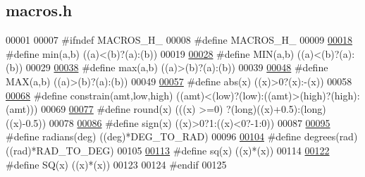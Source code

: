 \hypertarget{macros_8h_source}{}\subsection{macros.\+h}
\label{macros_8h_source}

\begin{DoxyCode}
00001 
00007 \textcolor{preprocessor}{#ifndef MACROS\_H\_}
00008 \textcolor{preprocessor}{#define MACROS\_H\_}
00009 
\hypertarget{macros_8h_source.tex_l00018}{}\hyperlink{macros_8h_ac6afabdc09a49a433ee19d8a9486056d}{00018} \textcolor{preprocessor}{#define min(a,b) ((a)<(b)?(a):(b))}
00019 
\hypertarget{macros_8h_source.tex_l00028}{}\hyperlink{macros_8h_a3acffbd305ee72dcd4593c0d8af64a4f}{00028} \textcolor{preprocessor}{#define MIN(a,b) ((a)<(b)?(a):(b))}
00029 
\hypertarget{macros_8h_source.tex_l00038}{}\hyperlink{macros_8h_affe776513b24d84b39af8ab0930fef7f}{00038} \textcolor{preprocessor}{#define max(a,b) ((a)>(b)?(a):(b))}
00039 
\hypertarget{macros_8h_source.tex_l00048}{}\hyperlink{macros_8h_afa99ec4acc4ecb2dc3c2d05da15d0e3f}{00048} \textcolor{preprocessor}{#define MAX(a,b) ((a)>(b)?(a):(b))}
00049 
\hypertarget{macros_8h_source.tex_l00057}{}\hyperlink{macros_8h_a3aa069ac3980707dae1e0530f50d59e4}{00057} \textcolor{preprocessor}{#define abs(x) ((x)>0?(x):-(x))}
00058 
\hypertarget{macros_8h_source.tex_l00068}{}\hyperlink{macros_8h_a7df4a1319e5665c9040aa1838eef987c}{00068} \textcolor{preprocessor}{#define constrain(amt,low,high) ((amt)<(low)?(low):((amt)>(high)?(high):(amt)))}
00069 
\hypertarget{macros_8h_source.tex_l00077}{}\hyperlink{macros_8h_a6ea10f4260b54a61665ead26cb995ba3}{00077} \textcolor{preprocessor}{#define round(x) (((x) >=0) ?(long)((x)+0.5):(long)((x)-0.5))}
00078 
\hypertarget{macros_8h_source.tex_l00086}{}\hyperlink{macros_8h_ac740756f75e53153605d2702b30d2a9d}{00086} \textcolor{preprocessor}{#define sign(x) ((x)>0?1:((x)<0?-1:0))}
00087 
\hypertarget{macros_8h_source.tex_l00095}{}\hyperlink{macros_8h_a7571dba2995b9cb57259345fe49d2f97}{00095} \textcolor{preprocessor}{#define radians(deg) ((deg)*DEG\_TO\_RAD)}
00096 
\hypertarget{macros_8h_source.tex_l00104}{}\hyperlink{macros_8h_afe93c2c14da376a1621194c15c1de496}{00104} \textcolor{preprocessor}{#define degrees(rad) ((rad)*RAD\_TO\_DEG)}
00105 
\hypertarget{macros_8h_source.tex_l00113}{}\hyperlink{macros_8h_ae7616788b30810a219d9cdee95904ba4}{00113} \textcolor{preprocessor}{#define sq(x) ((x)*(x))}
00114 
\hypertarget{macros_8h_source.tex_l00122}{}\hyperlink{macros_8h_ac3644f84794a8bfdacf39c4b2c2495fc}{00122} \textcolor{preprocessor}{#define SQ(x) ((x)*(x))}
00123 
00124 \textcolor{preprocessor}{#endif}
00125 
\end{DoxyCode}
